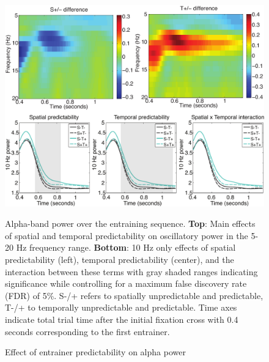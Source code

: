 \documentclass[dwyatte_dissertation.tex]{subfiles}
\begin{document}
\begin{figure}[h!]
\begin{center}
\includegraphics[width=160mm]{figs/chap_pleast/results_powphase_entrain_pow_montage.pdf}
\end{center}
\caption{Effect of entrainer predictability on alpha power}{Alpha-band power over the entraining sequence. \textbf{Top}: Main effects of spatial and temporal predictability on oscillatory power in the 5-20 Hz frequency range. \textbf{Bottom}: 10 Hz only effects of spatial predictability (left), temporal predictability (center), and the interaction between these terms with gray shaded ranges indicating significance while controlling for a maximum false discovery rate (FDR) of 5\%. S-/+ refers to spatially unpredictable and predictable, T-/+ to temporally unpredictable and predictable. Time axes indicate total trial time after the initial fixation cross with 0.4 seconds corresponding to the first entrainer.}
\label{fig:pleast_entrain_pow_10Hz}
\end{figure}
\end{document}
